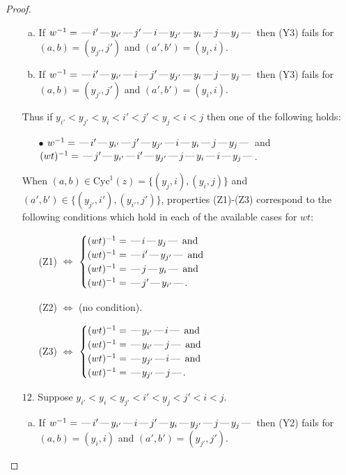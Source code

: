\documentclass[10pt]{article}
\theoremstyle{definition}
\theoremstyle{definition}
\def\dash{\text{\hspace{0.5mm}---\hspace{0.5mm}}}
\def\Cyc{\mathrm{Cyc}}
\begin{document}
\begin{proof}
\begin{enumerate}
\begin{enumerate}[(a)]
\item If $w^{-1} = \dash i'\dash y_{i'}\dash j'\dash i\dash y_{j'}\dash y_i\dash j\dash y_j\dash $ then (Y3) fails for $(a,b)=(y_{j'},j')$ and $(a',b')=(y_i,i)$.
\item If $w^{-1} = \dash i'\dash y_{i'}\dash i\dash j'\dash y_{j'}\dash y_i\dash j\dash y_j\dash $ then (Y3) fails for $(a,b)=(y_{j'},j')$ and $(a',b')=(y_i,i)$.
\end{enumerate}
Thus if $y_{i'} < y_{j'} < y_i < i' < j' < y_j < i < j$ then one of the following holds:
\begin{enumerate}
\item[$\bullet$] $w^{-1} = \dash i'\dash y_{i'}\dash j'\dash y_{j'}\dash i\dash y_i\dash j\dash y_j\dash $ and $(wt)^{-1} = \dash j'\dash y_{i'}\dash i'\dash y_{j'}\dash j\dash y_i\dash i\dash y_j\dash $.
\end{enumerate}
When $(a,b)\in\Cyc^1(z)=\{(y_j,i),(y_i,j)\}$ and $(a',b')\in\{(y_{j'},i'),(y_{i'},j')\}$,
properties (Z1)-(Z3) correspond to the following conditions which
hold in each of the available cases for $wt$:
\begin{enumerate}
\item[](Z1) $\Leftrightarrow$ $\begin{cases}\text{$(wt)^{-1} = \dash i \dash y_j \dash$}\text{ and }\\
\text{$(wt)^{-1} = \dash i' \dash y_{j'} \dash$}\text{ and }\\
\text{$(wt)^{-1} = \dash j \dash y_i \dash$}\text{ and }\\
\text{$(wt)^{-1} = \dash j' \dash y_{i'} \dash$}.\end{cases}$
\item[](Z2) $\Leftrightarrow$ (no condition).
\item[](Z3) $\Leftrightarrow$ $\begin{cases}\text{$(wt)^{-1} = \dash y_{i'} \dash i \dash$}\text{ and }\\
\text{$(wt)^{-1} = \dash y_{i'} \dash j \dash$}\text{ and }\\
\text{$(wt)^{-1} = \dash y_{j'} \dash i \dash$}\text{ and }\\
\text{$(wt)^{-1} = \dash y_{j'} \dash j \dash$}.\end{cases}$
\end{enumerate}
\item[$12$.] Suppose $y_{i'} < y_i < y_{j'} < i' < y_j < j' < i < j$.
\begin{enumerate}[(a)]
\item If $w^{-1} = \dash i'\dash y_{i'}\dash i\dash j'\dash y_i\dash y_{j'}\dash j\dash y_j\dash $ then (Y2) fails for $(a,b)=(y_i,i)$ and $(a',b')=(y_{j'},j')$.

\end{enumerate}
\end{enumerate}
\end{proof}
\end{document}
